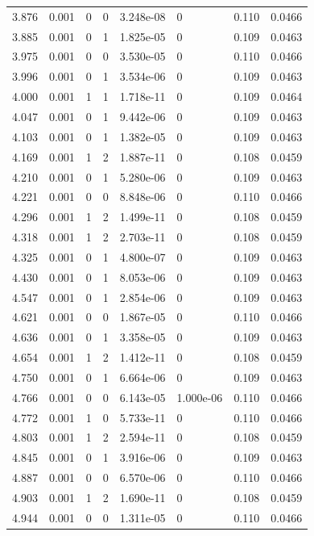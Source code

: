 \documentclass[preview]{standalone}
\begin{document}
{{{\begin{tabular}{L{1.2cm}C{1.2cm} C{0.3cm}C{0.5cm} C{1.4cm}C{1.4cm} C{1.4cm}C{1.4cm}}
  3.876  &  0.001  & 0     &  0 &  3.248e-08  & 0  & 0.110 &  0.0466   \\ 
  3.885  &  0.001  & 0     &  1 &  1.825e-05  & 0  & 0.109 &  0.0463   \\ 
  3.975  &  0.001  & 0     &  0 &  3.530e-05  & 0  & 0.110 &  0.0466   \\ 
  3.996  &  0.001  & 0     &  1 &  3.534e-06  & 0  & 0.109 &  0.0463   \\ 
  4.000  &  0.001  & 1     &  1 &  1.718e-11  & 0  & 0.109 &  0.0464   \\ 
  4.047  &  0.001  & 0     &  1 &  9.442e-06  & 0  & 0.109 &  0.0463   \\ 
  4.103  &  0.001  & 0     &  1 &  1.382e-05  & 0  & 0.109 &  0.0463   \\ 
  4.169  &  0.001  & 1     &  2 &  1.887e-11  & 0  & 0.108 &  0.0459   \\ 
  4.210  &  0.001  & 0     &  1 &  5.280e-06  & 0  & 0.109 &  0.0463   \\ 
  4.221  &  0.001  & 0     &  0 &  8.848e-06  & 0  & 0.110 &  0.0466   \\ 
  4.296  &  0.001  & 1     &  2 &  1.499e-11  & 0  & 0.108 &  0.0459   \\ 
  4.318  &  0.001  & 1     &  2 &  2.703e-11  & 0  & 0.108 &  0.0459   \\ 
  4.325  &  0.001  & 0     &  1 &  4.800e-07  & 0  & 0.109 &  0.0463   \\ 
  4.430  &  0.001  & 0     &  1 &  8.053e-06  & 0  & 0.109 &  0.0463   \\ 
  4.547  &  0.001  & 0     &  1 &  2.854e-06  & 0  & 0.109 &  0.0463   \\ 
  4.621  &  0.001  & 0     &  0 &  1.867e-05  & 0  & 0.110 &  0.0466   \\ 
  4.636  &  0.001  & 0     &  1 &  3.358e-05  & 0  & 0.109 &  0.0463   \\ 
  4.654  &  0.001  & 1     &  2 &  1.412e-11  & 0  & 0.108 &  0.0459   \\ 
  4.750  &  0.001  & 0     &  1 &  6.664e-06  & 0  & 0.109 &  0.0463   \\ 
  4.766  &  0.001  & 0     &  0 &  6.143e-05  & 1.000e-06  & 0.110 &  0.0466   \\ 
  4.772  &  0.001  & 1     &  0 &  5.733e-11  & 0  & 0.110 &  0.0466   \\ 
  4.803  &  0.001  & 1     &  2 &  2.594e-11  & 0  & 0.108 &  0.0459   \\ 
  4.845  &  0.001  & 0     &  1 &  3.916e-06  & 0  & 0.109 &  0.0463   \\ 
  4.887  &  0.001  & 0     &  0 &  6.570e-06  & 0  & 0.110 &  0.0466   \\ 
  4.903  &  0.001  & 1     &  2 &  1.690e-11  & 0  & 0.108 &  0.0459   \\ 
  4.944  &  0.001  & 0     &  0 &  1.311e-05  & 0  & 0.110 &  0.0466   \\ 
\hline 
\end{tabular} 

}}}
\end{document}
